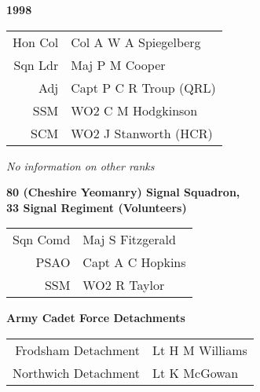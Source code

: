 \begin{center}
  \Huge
  \textbf{1998}
\end{center}

\begin{center}
  \small
  \begin{tabular}{rl}
    Hon Col & Col A W A Spiegelberg \\
    Sqn Ldr & Maj P M Cooper \\
    Adj & Capt P C R Troup (QRL) \\
    SSM & WO2 C M Hodgkinson \\
    SCM & WO2 J Stanworth (HCR) \\
  \end{tabular}
\end{center}

\begin{center}
  \textit{No information on other ranks}
\end{center}

\begin{center}
  \Large
  \textbf{80 (Cheshire Yeomanry) Signal Squadron, \\ 33 Signal Regiment (Volunteers)}
\end{center}

\begin{center}
  \small
  \begin{tabular}{rl}
    Sqn Comd & Maj S Fitzgerald \\
    PSAO & Capt A C Hopkins \\
    SSM & WO2 R Taylor \\
  \end{tabular}
\end{center}

\begin{center}
  \Large
  \textbf{Army Cadet Force Detachments}
\end{center}

\begin{center}
  \small
  \begin{tabular}{rl}
    Frodsham Detachment & Lt H M Williams \\
    Northwich Detachment & Lt K McGowan \\
  \end{tabular}
\end{center}

\vspace{50mm}

\pagebreak
